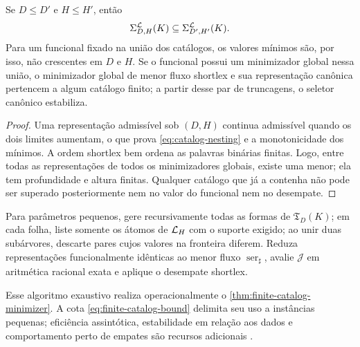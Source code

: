 \begin{proposition}
\label{prop:catalog-consistency}
Se $D\le D'$ e $H\le H'$, então
\begin{equation}
 \Sigma_{D,H}^{\mathcal{L}}(K)
 \subseteq\Sigma_{D',H'}^{\mathcal{L}}(K).
 \label{eq:catalog-nesting}
\end{equation}
Para um funcional fixado na união dos catálogos, os valores mínimos são, por
isso, não crescentes em $D$ e $H$. Se o funcional possui um minimizador global
nessa união, o minimizador global de menor fluxo shortlex e sua representação
canônica pertencem a algum catálogo finito; a partir desse par de truncagens,
o seletor canônico estabiliza.
\end{proposition}

\begin{proof}
Uma representação admissível sob $(D,H)$ continua admissível quando os dois
limites aumentam, o que prova \eqref{eq:catalog-nesting} e a monotonicidade dos
mínimos. A ordem shortlex bem ordena as palavras binárias finitas. Logo, entre
todas as representações de todos os minimizadores globais, existe uma menor;
ela tem profundidade e altura finitas. Qualquer catálogo que já a contenha não
pode ser superado posteriormente nem no valor do funcional nem no desempate.
\end{proof}

\begin{algorithm}\label{alg:finite-enumeration}
Para parâmetros pequenos, gere recursivamente todas as formas de
$\mathfrak T_D(K)$; em cada folha, liste somente os átomos de $\mathcal{L}_H$ com
o suporte exigido; ao unir duas subárvores, descarte pares cujos valores na
fronteira diferem. Reduza representações funcionalmente idênticas ao menor
fluxo $\operatorname{ser}_\sharp$, avalie $\mathcal J$ em aritmética racional
exata e aplique o desempate shortlex.
\end{algorithm}

Esse algoritmo exaustivo realiza operacionalmente o
\cref{thm:finite-catalog-minimizer}. A cota
\eqref{eq:finite-catalog-bound} delimita seu uso a instâncias pequenas;
eficiência assintótica, estabilidade em relação aos dados e comportamento
perto de empates são recursos adicionais \citep{christof2021}.

